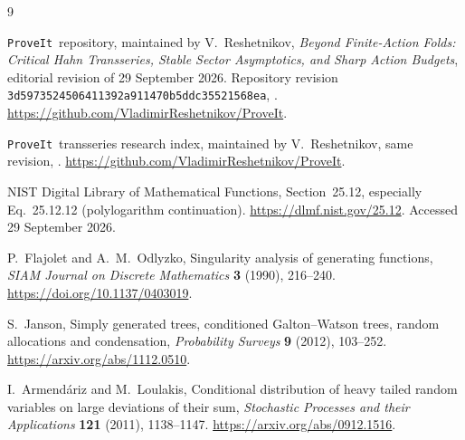 \documentclass[11pt,a4paper]{article}
\theoremstyle{definition}\newtheorem{definition}[theorem]{Definition}
\theoremstyle{remark}\newtheorem{remark}[theorem]{Remark}
\newcommand{\1}{\mathbf 1}
\newcommand{\repo}{\texttt{ProveIt}}
\begin{document}
\begin{thebibliography}{9}
\raggedright
{}
\repo\ repository, maintained by V.~Reshetnikov,
\emph{Beyond Finite-Action Folds: Critical Hahn Transseries, Stable Sector
Asymptotics, and Sharp Action Budgets}, editorial revision of
29 September 2026. Repository revision
\texttt{3d5973524506411392a911470b5ddc35521568ea},
.
\url{https://github.com/VladimirReshetnikov/ProveIt}.

\repo\ transseries research index, maintained by V.~Reshetnikov, same revision,
.
\url{https://github.com/VladimirReshetnikov/ProveIt}.

NIST Digital Library of Mathematical Functions,
Section~25.12, especially Eq.~25.12.12 (polylogarithm continuation).
\url{https://dlmf.nist.gov/25.12}.
Accessed 29 September 2026.

P.~Flajolet and A.~M.~Odlyzko,
Singularity analysis of generating functions,
\emph{SIAM Journal on Discrete Mathematics} \textbf{3} (1990), 216--240.
\url{https://doi.org/10.1137/0403019}.

S.~Janson,
Simply generated trees, conditioned Galton--Watson trees, random
allocations and condensation,
\emph{Probability Surveys} \textbf{9} (2012), 103--252.
\url{https://arxiv.org/abs/1112.0510}.

I.~Armend\'ariz and M.~Loulakis,
Conditional distribution of heavy tailed random variables on large
deviations of their sum,
\emph{Stochastic Processes and their Applications} \textbf{121} (2011),
1138--1147.
\url{https://arxiv.org/abs/0912.1516}.
\end{thebibliography}
\end{document}
